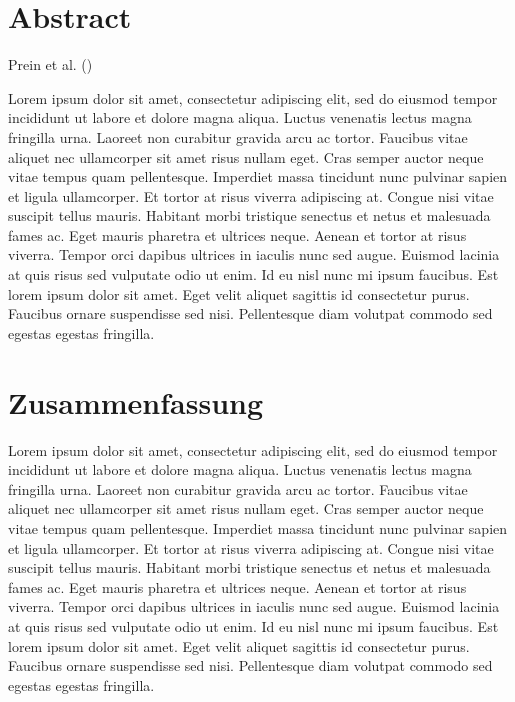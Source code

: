 \documentclass[
]{scrbook}
\begin{document}
\chapter{Abstract}\label{abstract}

Prein et al. ()

Lorem ipsum dolor sit amet, consectetur adipiscing elit, sed do eiusmod tempor incididunt ut labore et dolore magna aliqua. Luctus venenatis lectus magna fringilla urna. Laoreet non curabitur gravida arcu ac tortor. Faucibus vitae aliquet nec ullamcorper sit amet risus nullam eget. Cras semper auctor neque vitae tempus quam pellentesque. Imperdiet massa tincidunt nunc pulvinar sapien et ligula ullamcorper. Et tortor at risus viverra adipiscing at. Congue nisi vitae suscipit tellus mauris. Habitant morbi tristique senectus et netus et malesuada fames ac. Eget mauris pharetra et ultrices neque. Aenean et tortor at risus viverra. Tempor orci dapibus ultrices in iaculis nunc sed augue. Euismod lacinia at quis risus sed vulputate odio ut enim. Id eu nisl nunc mi ipsum faucibus. Est lorem ipsum dolor sit amet. Eget velit aliquet sagittis id consectetur purus. Faucibus ornare suspendisse sed nisi. Pellentesque diam volutpat commodo sed egestas egestas fringilla.

\chapter{Zusammenfassung}\label{zusammenfassung}

Lorem ipsum dolor sit amet, consectetur adipiscing elit, sed do eiusmod tempor incididunt ut labore et dolore magna aliqua. Luctus venenatis lectus magna fringilla urna. Laoreet non curabitur gravida arcu ac tortor. Faucibus vitae aliquet nec ullamcorper sit amet risus nullam eget. Cras semper auctor neque vitae tempus quam pellentesque. Imperdiet massa tincidunt nunc pulvinar sapien et ligula ullamcorper. Et tortor at risus viverra adipiscing at. Congue nisi vitae suscipit tellus mauris. Habitant morbi tristique senectus et netus et malesuada fames ac. Eget mauris pharetra et ultrices neque. Aenean et tortor at risus viverra. Tempor orci dapibus ultrices in iaculis nunc sed augue. Euismod lacinia at quis risus sed vulputate odio ut enim. Id eu nisl nunc mi ipsum faucibus. Est lorem ipsum dolor sit amet. Eget velit aliquet sagittis id consectetur purus. Faucibus ornare suspendisse sed nisi. Pellentesque diam volutpat commodo sed egestas egestas fringilla.
\end{document}
